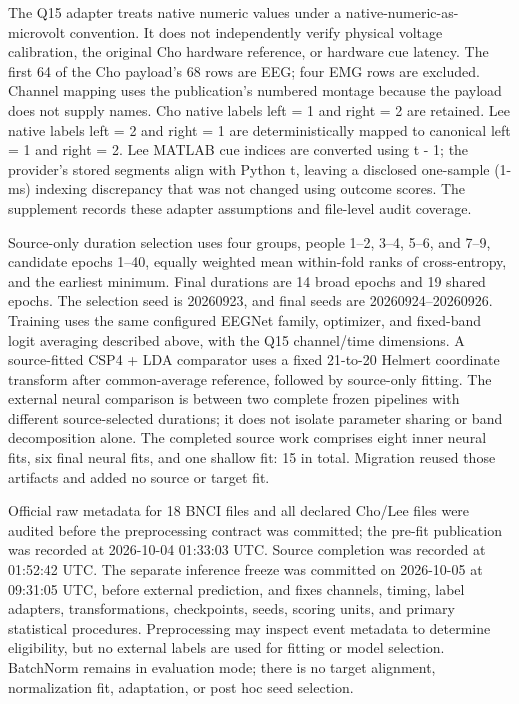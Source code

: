 \documentclass[11pt]{article}
\begin{document}
The Q15 adapter treats native numeric values under a native-numeric-as-microvolt convention. It does not independently verify physical voltage calibration, the original Cho hardware reference, or hardware cue latency. The first 64 of the Cho payload's 68 rows are EEG; four EMG rows are excluded. Channel mapping uses the publication's numbered montage because the payload does not supply names. Cho native labels left = 1 and right = 2 are retained. Lee native labels left = 2 and right = 1 are deterministically mapped to canonical left = 1 and right = 2. Lee MATLAB cue indices are converted using t - 1; the provider's stored segments align with Python t, leaving a disclosed one-sample (1-ms) indexing discrepancy that was not changed using outcome scores. The supplement records these adapter assumptions and file-level audit coverage.

Source-only duration selection uses four groups, people 1--2, 3--4, 5--6, and 7--9, candidate epochs 1--40, equally weighted mean within-fold ranks of cross-entropy, and the earliest minimum. Final durations are 14 broad epochs and 19 shared epochs. The selection seed is 20260923, and final seeds are 20260924--20260926. Training uses the same configured EEGNet family, optimizer, and fixed-band logit averaging described above, with the Q15 channel/time dimensions. A source-fitted CSP4 + LDA comparator uses a fixed 21-to-20 Helmert coordinate transform after common-average reference, followed by source-only fitting. The external neural comparison is between two complete frozen pipelines with different source-selected durations; it does not isolate parameter sharing or band decomposition alone. The completed source work comprises eight inner neural fits, six final neural fits, and one shallow fit: 15 in total. Migration reused those artifacts and added no source or target fit.

Official raw metadata for 18 BNCI files and all declared Cho/Lee files were audited before the preprocessing contract was committed; the pre-fit publication was recorded at 2026-10-04 01:33:03 UTC. Source completion was recorded at 01:52:42 UTC. The separate inference freeze was committed on 2026-10-05 at 09:31:05 UTC, before external prediction, and fixes channels, timing, label adapters, transformations, checkpoints, seeds, scoring units, and primary statistical procedures. Preprocessing may inspect event metadata to determine eligibility, but no external labels are used for fitting or model selection. BatchNorm remains in evaluation mode; there is no target alignment, normalization fit, adaptation, or post hoc seed selection.
\end{document}
